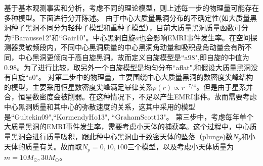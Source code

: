 基于基本观测事实和分析，考虑不同的理论模型，则上述每一步的物理量可能存在多种模型。下面进行分开陈述。
由于中心大质量黑洞分布的不确定性(如大质量黑洞种子黑洞不同分为轻种子模型和重种子模型），目前大质量黑洞质量函数可分为``Barausse12"\cite{shankar2008self,shankar2013black}和``Gair10"\cite{gair2010lisa}。中心黑洞自旋$a$也会影响EMRI事件发生率。在空间探测器灵敏频段内，不同中心黑洞质量的中心黑洞角动量和吸积盘角动量会有所不同\cite{sesana2014linking}，中心黑洞更倾向于高自旋黑洞，故而定义自旋模型是``a98",即自旋的中值为0.98。为了进行比较，取另外一个自旋模型是均匀分布``aflat",和假设大质量黑洞没有自旋``a0"。
对第二步中的物理量，主要围绕中心大质量黑洞的数密度尖峰结构的模型，主要采用恒星数密度尖峰满足幂律关系$\rho(r)\propto r^{-7/4}$。但是由于星系并合，恒星数密度会被削弱。在这种情况下，不足以产生EMRI事件。故而需要考虑中心黑洞质量和其中心的弥散速度的关系，这其中采用的模型是``Gultekin09"\cite{gultekin2009m},``KormendyHo13"\cite{kormendy2013coevolution},
``GrahamScott13"\cite{graham2012black}。
第三步中，考虑每年单个大质量黑洞的EMRI事件发生率，需要考虑小天体的捕获率。这个过程中，中心质量黑洞会进行质量吸积，跟此种中心黑洞由于致密天体的坠落（plunge)数$N_p$和小天体的质量有关。故而取$N_p=0,10,100$三个模型\cite{babak2017science}，以及考虑小天体质量为$m=10 M_{\odot},30M_{\odot}$\cite{woosley2002evolution}。

